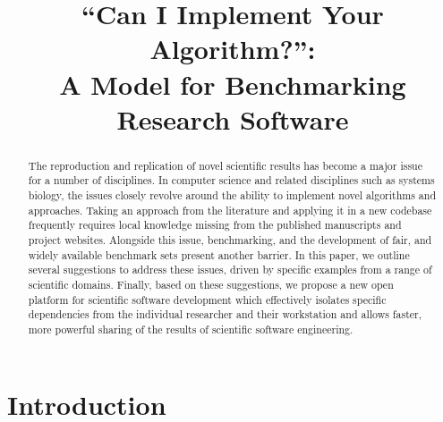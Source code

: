 \documentclass[conference]{IEEEtran}
\begin{document}

\title{``Can I Implement Your Algorithm?'':\\ A Model for Benchmarking Research Software}

\author{
\and
{}
\and
{}
 }

\maketitle

\begin{abstract}
The reproduction and replication of novel scientific results has
become a major issue for a number of disciplines. In computer science
and related disciplines such as systems biology, the issues closely
revolve around the ability to implement novel algorithms and
approaches. Taking an approach from the literature and applying it in
a new codebase frequently requires local knowledge missing from the
published manuscripts and project websites. Alongside this issue,
benchmarking, and the development of fair, and widely available
benchmark sets present another barrier. In this paper, we outline
several suggestions to address these issues, driven by specific
examples from a range of scientific domains.  Finally, based on these
suggestions, we propose a new open platform for scientific software
development which effectively isolates specific dependencies from the
individual researcher and their workstation and allows faster, more
powerful sharing of the results of scientific software engineering.
\end{abstract}

\IEEEpeerreviewmaketitle

\section{Introduction}
\end{document}
